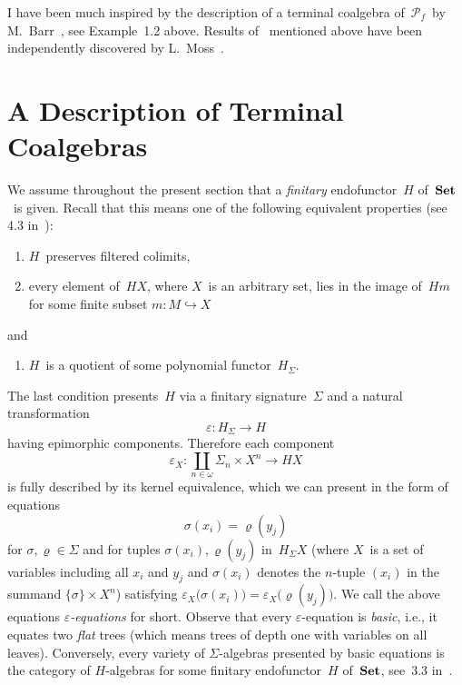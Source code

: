 \documentclass{entcs}
\newcommand{\Set}{\ensuremath{\St}}
\newcommand{\Pf}{\ensuremath{\mathscr{P}_{\!\!f}}}
\DeclareMathOperator{\St}{\textnormal{\textbf{Set}}}
\newenvironment{pv}[1]{\begin{trivlist}
\item[\hspace{\labelsep}\normalfont\bfseries#1]}%
{\end{trivlist}}
\begin{document}
\begin{pv}{Related Results}
I have been much inspired by the description of a terminal
coalgebra of~\Pf\ by M.~Barr~\cite{b}, see Example~1.2 above.
Results of~\cite{aamv} mentioned above
have been independently discovered by L.~Moss~\cite{m}.
\end{pv}

\section{A Description of Terminal Coalgebras}
\begin{pv}{2.1 Assumption}
We assume throughout the present section that a \textit{finitary}
endofunctor~$H$ of~\Set\
is given. Recall that this means one of the following equivalent
properties (see 4.3 in~\cite{at}):
\begin{enumerate}
\item[(i)]
$H$~preserves filtered colimits,
\item[(ii)]
every element of~$HX$, where $X$~is an arbitrary set, lies in the
image of~$Hm$
for some finite subset $m\colon M\hookrightarrow X$
\end{enumerate}
and
\begin{enumerate}
\item[(iii)]
$H$~is a quotient of some polynomial functor~$H_\Sigma$.
\end{enumerate}
The last condition presents~$H$ via a finitary signature~$\Sigma$
and a natural transformation
\[\varepsilon\colon H_\Sigma\to H\]
having epimorphic components. Therefore each component
\[\varepsilon_X\colon \coprod_{n\in\omega}
\Sigma_n\times X^n\to HX\]
is fully described by its kernel equivalence, which we can present
in the form of equations
\[\sigma(x_i)=\varrho(y_j)\]
for $\sigma,\varrho\in\Sigma$ and for tuples
$\sigma(x_i),\varrho(y_j)$ in~$H_\Sigma X$ (where $X$~is a set of
variables including all $x_i$ and $y_j$ and $\sigma(x_i)$ denotes the
$n$-tuple $(x_i)$ in the summand $\{\sigma\}\times X^n$) satisfying
$\varepsilon_X\bigl(\sigma(x_i)\bigr)=
\varepsilon_X\bigl(\varrho(y_j)\bigr)$.
We call the above equations \textit{$\varepsilon$-equations} for short.
Observe that every $\varepsilon$-equation is \textit{basic}, i.e.,
it
equates two \textit{flat}
trees (which means trees of depth one with variables on all leaves).
Conversely,
every variety of $\Sigma$-algebras presented by basic equations is
the category of $H$-algebras for some finitary endofunctor~$H$
of~\Set, see~3.3 in~\cite{at}.
\end{pv}
\end{document}
